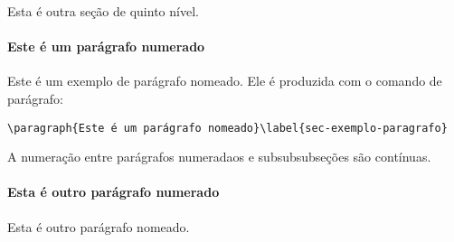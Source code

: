 \label{sec-exemplo-subsubsubsection-outro}

Esta é outra seção de quinto nível.


\paragraph{Este é um parágrafo numerado}\label{sec-exemplo-paragrafo}

Este é um exemplo de parágrafo nomeado. Ele é produzida com o comando de
parágrafo:

\begin{verbatim}
\paragraph{Este é um parágrafo nomeado}\label{sec-exemplo-paragrafo}
\end{verbatim}

A numeração entre parágrafos numeradaos e subsubsubseções são contínuas.

\paragraph{Esta é outro parágrafo numerado}\label{sec-exemplo-paragrafo-outro}

Esta é outro parágrafo nomeado.
